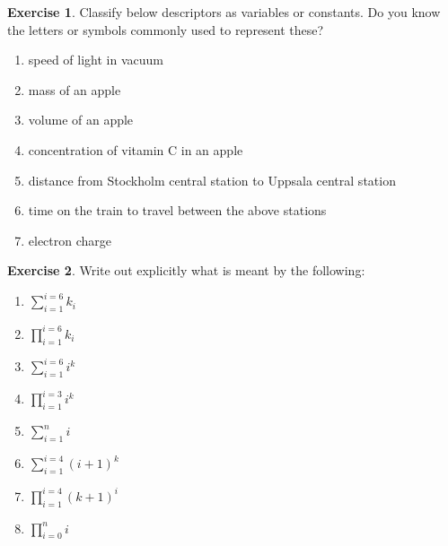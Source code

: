 \documentclass[
]{book}
\providecommand{\tightlist}{%
  \setlength{\itemsep}{0pt}\setlength{\parskip}{0pt}}
\theoremstyle{definition}
\theoremstyle{definition}
\theoremstyle{definition}
\newtheorem{exercise}{Exercise}[chapter]
\theoremstyle{remark}
\begin{document}
\begin{exercise}
\protect\hypertarget{exr:m-notations-variables-constants}{}{\label{exr:m-notations-variables-constants} }Classify below descriptors as variables or constants. Do you know the letters or symbols commonly used to represent these?

\begin{enumerate}
\def\labelenumi{\alph{enumi})}
\tightlist
\item
  speed of light in vacuum
\item
  mass of an apple
\item
  volume of an apple
\item
  concentration of vitamin C in an apple
\item
  distance from Stockholm central station to Uppsala central station
\item
  time on the train to travel between the above stations
\item
  electron charge
\end{enumerate}
\end{exercise}

\begin{exercise}
\protect\hypertarget{exr:m-notations-sigma-product}{}{\label{exr:m-notations-sigma-product} }Write out explicitly what is meant by the following:

\begin{enumerate}
\def\labelenumi{\alph{enumi})}
\item
  \(\displaystyle \sum_{i=1}^{i=6}k_i\)
\item
  \(\displaystyle \prod_{i=1}^{i=6}k_i\)
\item
  \(\displaystyle \sum_{i=1}^{i=6}i^k\)
\item
  \(\displaystyle \prod_{i=1}^{i=3}i^k\)
\item
  \(\displaystyle \sum_{i=1}^{n}i\)
\item
  \(\displaystyle \sum_{i=1}^{i=4}(i + 1)^k\)
\item
  \(\displaystyle \prod_{i=1}^{i=4}(k + 1)^i\)
\item
  \(\displaystyle \prod_{i=0}^{n}i\)
\end{enumerate}
\end{exercise}
\end{document}
